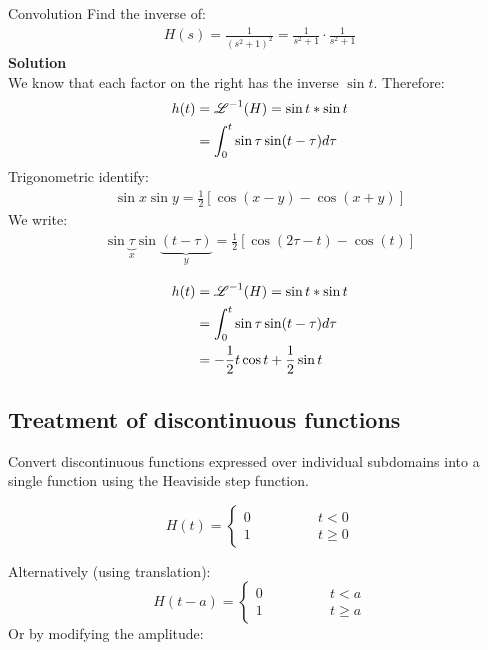 \begin{exmp}{Convolution}{}
Find the inverse of:
\begin{align*}
H(s)=\frac{1}{(s^2+1)^2}=\frac{1}{s^2+1}\cdot \frac{1}{s^2+1}
\end{align*}
\textbf{Solution}\\
We know that each factor on the right has the inverse $\sin t$. Therefore:\begin{align*}
h(t)&=\operatorname{\mathscr{L}}^{-1}(H)=\sin t * \sin t  \\
&=\int^t_0 \sin \tau \sin (t-\tau)d\tau\\
\end{align*}
Trigonometric identify:
\begin{align*}
\sin x\sin y = \frac{1}{2}\left[\cos(x-y)-\cos(x+y)\right]
\end{align*}
We write:
\begin{align*}
\sin \underbrace{\tau}_x \sin \underbrace{(t-\tau)}_y =  \frac{1}{2}\left[\cos(2\tau-t)-\cos(t)\right]
\end{align*}

\begin{align*}
h(t)&=\operatorname{\mathscr{L}}^{-1}(H)=\sin t * \sin t\\
&=\int^t_0 \sin \tau \sin (t-\tau)d\tau\\
&= -\frac{1}{2}t\cos t+\frac{1}{2}\sin t
\end{align*}

\end{exmp}



\subsection{Treatment of discontinuous functions}
Convert discontinuous functions expressed over individual subdomains into a single function using the Heaviside step function.

\begin{equation*}
H(t)=
\begin{cases}
0 \qquad \qquad &t<0\\
1 &t\geq 0
\end{cases}
\end{equation*}

Alternatively (using translation):
\begin{equation*}
H(t-a)=
\begin{cases}
0 \qquad \qquad &t<a\\
1 &t\geq a
\end{cases}
\end{equation*}
Or by modifying the amplitude:

